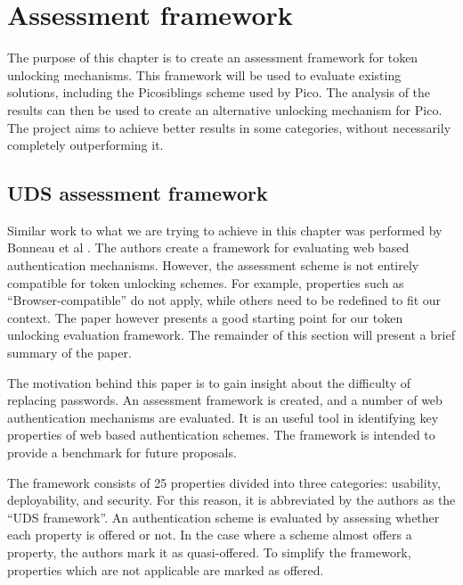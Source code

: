 
\chapter{Assessment framework}

\label{Chapter5}


The purpose of this chapter is to create an assessment framework for token unlocking mechanisms. This framework will be used to evaluate existing solutions, including the Picosiblings scheme used by Pico. The analysis of the results can then be used to create an alternative unlocking mechanism for Pico. The project aims to achieve better results in some categories, without necessarily completely outperforming it.

\section{UDS assessment framework}

Similar work to what we are trying to achieve in this chapter was performed by Bonneau et al \cite{bonneau2012quest}. The authors create a framework for evaluating web based authentication mechanisms. However, the assessment scheme is not entirely compatible for token unlocking schemes. For example, properties such as ``Browser-compatible'' do not apply, while others need to be redefined to fit our context.  The paper however presents a good starting point for our token unlocking evaluation framework. The remainder of this section will present a brief summary of the paper.

The motivation behind this paper is to gain insight about the difficulty of replacing passwords. An assessment framework is created, and a number of web authentication mechanisms are evaluated. It is an useful tool in identifying key properties of web based authentication schemes. The framework is intended to provide a benchmark for future proposals.

The framework consists of 25 properties divided into three categories: usability, deployability, and security. For this reason, it is abbreviated by the authors as the ``UDS framework''. An authentication scheme is evaluated by assessing whether each property is offered or not. In the case where a scheme almost offers a property, the authors mark it as quasi-offered. To simplify the framework, properties which are not applicable are marked as offered.

